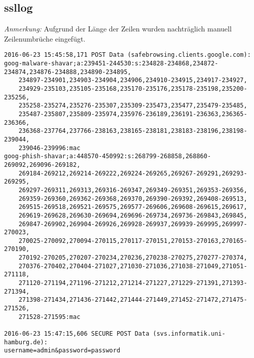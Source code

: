 \documentclass[twoside]{article}
\begin{document}
	\subsection*{ssllog}
		\label{ssllog}
		\textit{Anmerkung:} Aufgrund der Länge der Zeilen wurden nachträglich manuell Zeilenumbrüche eingefügt.
\begin{lstlisting}
2016-06-23 15:45:58,171 POST Data (safebrowsing.clients.google.com):
goog-malware-shavar;a:239451-244530:s:234828-234868,234872-234874,234876-234888,234890-234895,
    234897-234901,234903-234904,234906,234910-234915,234917-234927,
    234929-235103,235105-235168,235170-235176,235178-235198,235200-235256,
    235258-235274,235276-235307,235309-235473,235477,235479-235485,
    235487-235807,235809-235974,235976-236189,236191-236363,236365-236366,
    236368-237764,237766-238163,238165-238181,238183-238196,238198-239044,
    239046-239996:mac
goog-phish-shavar;a:448570-450992:s:268799-268858,268860-269092,269096-269182,
    269184-269212,269214-269222,269224-269265,269267-269291,269293-269295,
    269297-269311,269313,269316-269347,269349-269351,269353-269356,
    269359-269360,269362-269368,269370,269390-269392,269408-269513,
    269515-269518,269521-269575,269577-269606,269608-269615,269617,
    269619-269628,269630-269694,269696-269734,269736-269843,269845,
    269847-269902,269904-269926,269928-269937,269939-269995,269997-270023,
    270025-270092,270094-270115,270117-270151,270153-270163,270165-270190,
    270192-270205,270207-270234,270236,270238-270275,270277-270374,
    270376-270402,270404-271027,271030-271036,271038-271049,271051-271118,
    271120-271194,271196-271212,271214-271227,271229-271391,271393-271394,
    271398-271434,271436-271442,271444-271449,271452-271472,271475-271526,
    271528-271595:mac

2016-06-23 15:47:15,606 SECURE POST Data (svs.informatik.uni-hamburg.de):
username=admin&password=password

\end{lstlisting}
\end{document}
